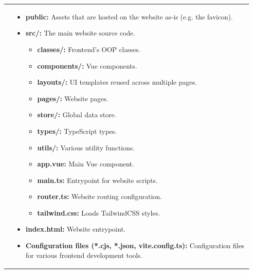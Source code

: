 \documentclass[notitlepage, 12pt]{report}
\begin{document}
\begin{xltabular}{\textwidth}{
		@{}
		p{0.3\textwidth}
		X
	}
	\centerline{}
	 &
	\begin{itemize}[label={}, leftmargin=5pt]
		\item \textbf{public:} Assets that are hosted on the website as-is (e.g. the favicon).
		\item \textbf{src/:} The main website source code.
		      \begin{itemize}[label={}]
			      \item \textbf{classes/:} Frontend’s OOP classes.
			      \item \textbf{components/:} Vue components.
			      \item \textbf{layouts/:} UI templates reused across multiple pages.
			      \item \textbf{pages/:} Website pages.
			      \item \textbf{store/:} Global data store.
			      \item \textbf{types/:} TypeScript types.
			      \item \textbf{utils/:} Various utility functions.
			      \item \textbf{app.vue:} Main Vue component.
			      \item \textbf{main.ts:} Entrypoint for website scripts.
			      \item \textbf{router.ts:} Website routing configuration.
			      \item \textbf{tailwind.css:} Loads TailwindCSS styles.
		      \end{itemize}
		\item \textbf{index.html:} Website entrypoint.
		\item \textbf{Configuration files (*.cjs, *.json, vite.config.ts):} Configuration files for various frontend development tools.
	\end{itemize}
\end{xltabular}
\end{document}
